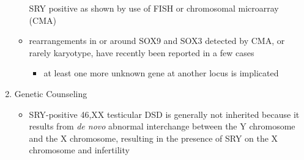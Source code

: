\documentclass[12pt]{scrartcl}
\begin{document}
\begin{enumerate}
\begin{itemize}
SRY positive as shown by use of FISH or chromosomal microarray (CMA)
\item rearrangements in or around SOX9 and SOX3 detected by CMA, or rarely
karyotype, have recently been reported in a few cases
\begin{itemize}
\item at least one more unknown gene at another locus is implicated
\end{itemize}
\end{itemize}
\item Genetic Counseling
\label{sec:orgd02436e}
\begin{itemize}
\item SRY-positive 46,XX testicular DSD is generally not inherited because
it results from \emph{de novo} abnormal interchange between the Y
chromosome and the X chromosome, resulting in the presence of SRY on
the X chromosome and infertility
\end{itemize}
\end{enumerate}
\end{document}
